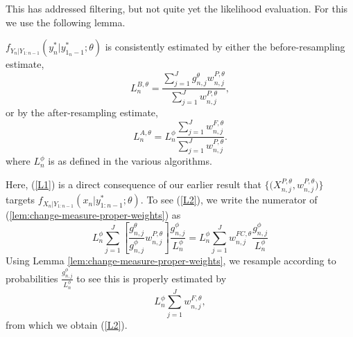 

This has addressed filtering, but not quite yet the likelihood evaluation. For this we use the following lemma.

\begin{lem}
    \label{lem:lik-proper-weight}
  $f_{Y_n|Y_{1:n-1}}(y_n^*|y_{1_n-1}^*;\theta)$ is consistently estimated by either the before-resampling estimate,
\begin{equation}\label{L1}
L_n^{B,\theta} =  \frac{\sum_{j=1}^Jg^\theta_{n,j} w^{P,\theta}_{n,j}}{\sum_{j=1}^J  w^{P,\theta}_{n,j}},
\end{equation}
or by the after-resampling estimate,
\begin{equation}\label{L2}
L_n^{A,\theta} = L^\phi_n \frac{\sum_{j=1}^Jw^{F,\theta}_{n,j}}{\sum_{j=1}^J  w^{P,\theta}_{n,j}}.
\end{equation}
where $L^\phi_n$ is as defined in the various algorithms.
\end{lem}

Here, (\ref{L1}) is a direct consequence of our earlier result that $\{ \big(X^{P,\theta}_{n,j},w^{P,\theta}_{n,j}\big) \}$ targets $f_{X_{n}|Y_{1:n-1}}(x_{n}|y^*_{1:n-1};\theta)$.
To see  (\ref{L2}),
we write the numerator of (\ref{lem:change-measure-proper-weights}) as
\[
L^\phi_n \sum_{j=1}^J \left[ \frac{g^\theta_{n,j}}{g^\phi_{n,j}} w^{P,\theta}_{n,j}\right] \frac{g^\phi_{n,j}}{L_n^\phi}
= L^\phi_n \sum_{j=1}^J w_{n,j}^{FC,\theta} \frac{g^\phi_{n,j}}{L_n^\phi}
\]
Using Lemma \ref{lem:change-measure-proper-weights}, we resample according to probabilities $\frac{g^\phi_{n,j}}{L_n^\phi}$ to see this is properly estimated by
\[
L^\phi_n \sum_{j=1}^J w^{F,\theta}_{n,j},
\]
from which we obtain (\ref{L2}).

